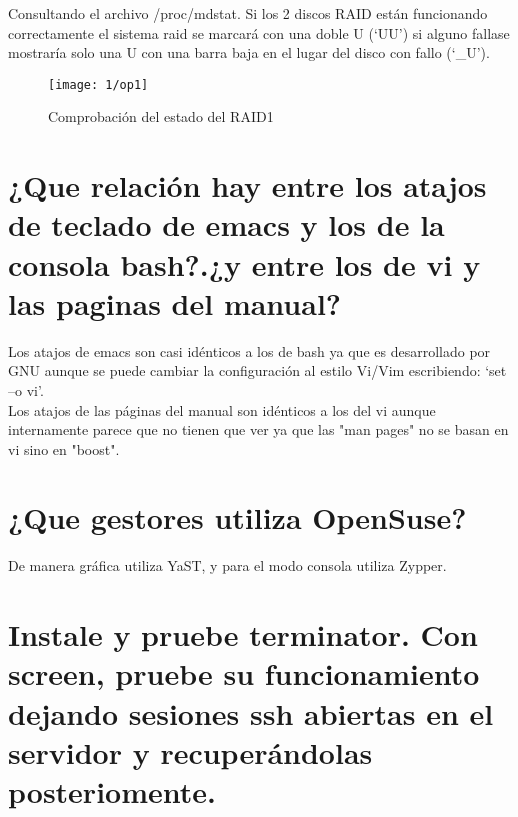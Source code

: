 Consultando el archivo /proc/mdstat. Si los 2 discos RAID están funcionando correctamente el sistema raid se marcará con una doble U (‘UU’) si alguno fallase mostraría solo una U con una barra baja en el lugar del disco con fallo (‘\_U’).\\
\begin{figure}[H]
	\centering
	\texttt{[image: 1/op1]}
	\caption{Comprobación del estado del RAID1}
	\label{fig:f01}
\end{figure}


\section{¿Que relación hay entre los atajos de teclado de emacs y los de la consola bash?.¿y entre los de vi y las paginas del manual?}

Los atajos de emacs son casi idénticos a los de bash ya que es desarrollado por GNU aunque se puede cambiar la configuración al estilo Vi/Vim escribiendo:  ‘set –o vi’.\\

Los atajos de las páginas del manual son idénticos a los del vi aunque internamente parece que no tienen que ver ya que las "man pages" no se basan en vi sino en "boost".


\section{¿Que gestores utiliza OpenSuse?}

De manera gráfica utiliza YaST, y para el modo consola utiliza Zypper.

\clearpage
\section{Instale y pruebe terminator. Con screen, pruebe su funcionamiento dejando sesiones ssh abiertas en el servidor y recuperándolas posteriomente.}

